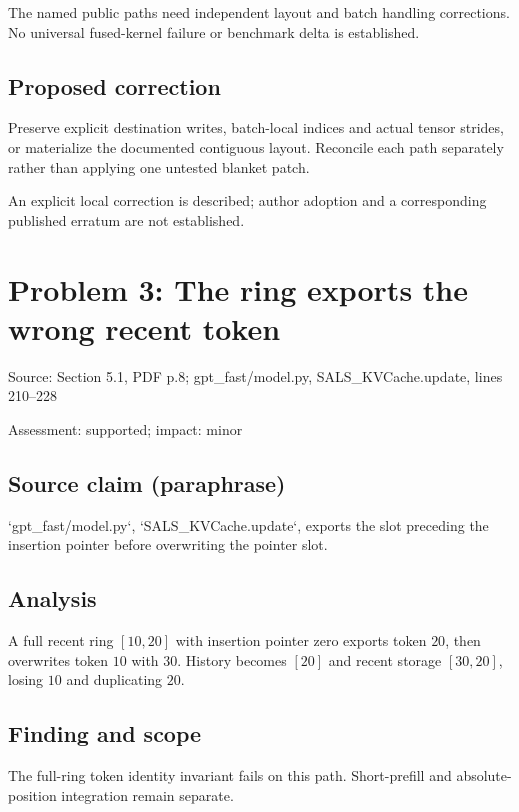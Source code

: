 \documentclass[11pt]{article}
\begin{document}
The named public paths need independent layout and batch handling corrections. No universal fused-kernel failure or benchmark delta is established.

\subsection*{Proposed correction}

Preserve explicit destination writes, batch-local indices and actual tensor strides, or materialize the documented contiguous layout. Reconcile each path separately rather than applying one untested blanket patch.

An explicit local correction is described; author adoption and a corresponding published erratum are not established.

\section*{Problem 3: The ring exports the wrong recent token}

Source: Section 5.1, PDF p.8; gpt\_fast/model.py, SALS\_KVCache.update, lines 210–228

Assessment: supported; impact: minor

\subsection*{Source claim (paraphrase)}

`gpt\_fast/model.py`, `SALS\_KVCache.update`, exports the slot preceding the insertion pointer before overwriting the pointer slot.

\subsection*{Analysis}

A full recent ring \([10,20]\) with insertion pointer zero exports token \(20\), then overwrites token \(10\) with \(30\). History becomes \([20]\) and recent storage \([30,20]\), losing \(10\) and duplicating \(20\).

\subsection*{Finding and scope}

The full-ring token identity invariant fails on this path. Short-prefill and absolute-position integration remain separate.
\end{document}
